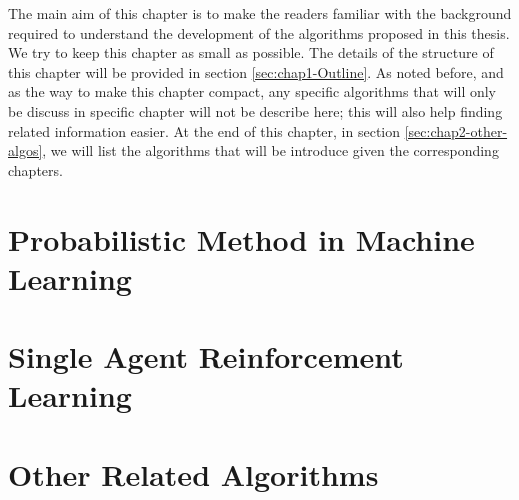 \label{chapter:chap2}
\begin{adjustwidth}{1cm}{}
    The main aim of this chapter is to make the readers familiar with the background required to understand the development of the algorithms proposed in this thesis. We try to keep this chapter as small as possible. The details of the structure of this chapter will be provided in section \ref{sec:chap1-Outline}. As noted before, and as the way to make this chapter compact, any specific algorithms that will only be discuss in specific chapter will not be describe here; this will also help finding related information easier. At the end of this chapter, in section \ref{sec:chap2-other-algos}, we will list the algorithms that will be introduce given the corresponding chapters.
\end{adjustwidth}


\section{Probabilistic Method in Machine Learning}


\section{Single Agent Reinforcement Learning}


\section{Other Related Algorithms}


